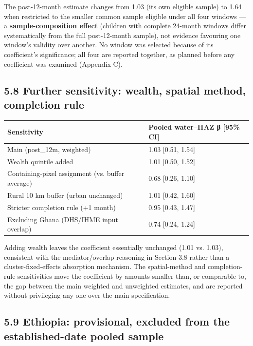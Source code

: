 The post-12-month estimate changes from 1.03 (its own eligible sample) to 1.64 when restricted to the smaller common sample eligible under all four windows --- a \textbf{sample-composition effect} (children with complete 24-month windows differ systematically from the full post-12-month sample), not evidence favouring one window's validity over another. No window was selected because of its coefficient's significance; all four are reported together, as planned before any coefficient was examined (Appendix C).

\subsection*{5.8 Further sensitivity: wealth, spatial method, completion rule}

\begingroup\fontsize{10}{15}\selectfont
\begin{longtable}{ll}
\toprule
Sensitivity & Pooled water--HAZ β [95\% CI] \\
\midrule
\endhead
Main (post\_12m, weighted) & 1.03 [0.51, 1.54] \\
Wealth quintile added & 1.01 [0.50, 1.52] \\
Containing-pixel assignment (vs. buffer average) & 0.68 [0.26, 1.10] \\
Rural 10 km buffer (urban unchanged) & 1.01 [0.42, 1.60] \\
Stricter completion rule (+1 month) & 0.95 [0.43, 1.47] \\
Excluding Ghana (DHS/IHME input overlap) & 0.74 [0.24, 1.24] \\
\bottomrule
\end{longtable}
\endgroup

Adding wealth leaves the coefficient essentially unchanged (1.01 vs. 1.03), consistent with the mediator/overlap reasoning in Section 3.8 rather than a cluster-fixed-effects absorption mechanism. The spatial-method and completion-rule sensitivities move the coefficient by amounts smaller than, or comparable to, the gap between the main weighted and unweighted estimates, and are reported without privileging any one over the main specification.

\subsection*{5.9 Ethiopia: provisional, excluded from the established-date pooled sample}

